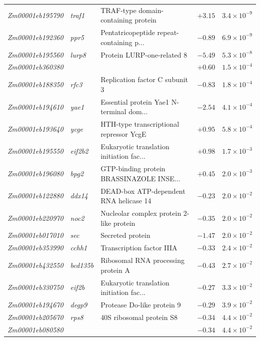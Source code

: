 \documentclass[9pt,twocolumn,twoside]{rilabRxiv}
\begin{document}
\begin{table}[!ht]
\begin{tabular}{@{}lllrr@{}}
\textit{Zm00001eb195790} & \textit{traf1} & TRAF-type domain-containing protein & $+3.15$ & $3.4 \times 10^{-9}$ \\
\textit{Zm00001eb192360} & \textit{ppr5} & Pentatricopeptide repeat-containing p... & $-0.89$ & $6.9 \times 10^{-9}$ \\
\textit{Zm00001eb195560} & \textit{lurp8} & Protein LURP-one-related 8 & $-5.49$ & $5.3 \times 10^{-8}$ \\
\textit{Zm00001eb360380} &  &  & $+0.60$ & $1.5 \times 10^{-4}$ \\
\textit{Zm00001eb188350} & \textit{rfc3} & Replication factor C subunit 3 & $-0.83$ & $1.8 \times 10^{-4}$ \\
\textit{Zm00001eb194610} & \textit{yae1} & Essential protein Yae1 N-terminal dom... & $-2.54$ & $4.1 \times 10^{-4}$ \\
\textit{Zm00001eb193640} & \textit{ycge} & HTH-type transcriptional repressor YcgE & $+0.95$ & $5.8 \times 10^{-4}$ \\
\textit{Zm00001eb195550} & \textit{eif2b2} & Eukaryotic translation initiation fac... & $+0.98$ & $1.7 \times 10^{-3}$ \\
\textit{Zm00001eb196080} & \textit{bpg2} & GTP-binding protein BRASSINAZOLE INSE... & $+0.45$ & $2.0 \times 10^{-3}$ \\
\textit{Zm00001eb122880} & \textit{ddx14} & DEAD-box ATP-dependent RNA helicase 14 & $-0.23$ & $2.0 \times 10^{-2}$ \\
\textit{Zm00001eb220970} & \textit{noc2} & Nucleolar complex protein 2-like protein & $-0.35$ & $2.0 \times 10^{-2}$ \\
\textit{Zm00001eb017010} & \textit{sec} & Secreted protein & $-1.47$ & $2.0 \times 10^{-2}$ \\
\textit{Zm00001eb353990} & \textit{cchh1} & Transcription factor IIIA & $-0.33$ & $2.4 \times 10^{-2}$ \\
\textit{Zm00001eb432550} & \textit{bcd135b} & Ribosomal RNA processing protein A & $-0.43$ & $2.7 \times 10^{-2}$ \\
\textit{Zm00001eb330750} & \textit{eif2b} & Eukaryotic translation initiation fac... & $-0.27$ & $3.3 \times 10^{-2}$ \\
\textit{Zm00001eb194670} & \textit{degp9} & Protease Do-like protein 9 & $-0.29$ & $3.9 \times 10^{-2}$ \\
\textit{Zm00001eb205670} & \textit{rps8} & 40S ribosomal protein S8 & $-0.34$ & $4.4 \times 10^{-2}$ \\
\textit{Zm00001eb080580} &  &  & $-0.34$ & $4.4 \times 10^{-2}$ \\

\end{tabular}
\end{table}
\end{document}
